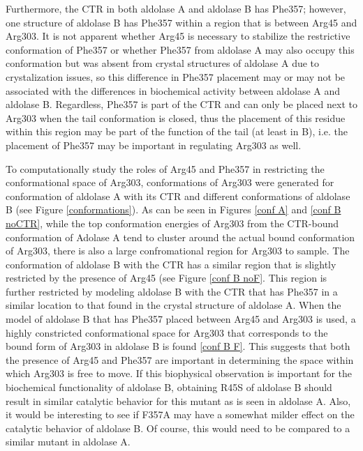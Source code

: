 \documentclass[11pt,a4paper]{article}
\begin{document}
	Furthermore,
	the CTR in both aldolase A and aldolase B has Phe357; however, one structure of aldolase B has Phe357 within a region that is
	between Arg45 and Arg303.  It is not apparent whether Arg45 is necessary to stabilize the restrictive conformation of Phe357 or whether Phe357
	from aldolase A may
	also occupy this conformation but was absent from crystal structures of aldolase A due to crystalization issues, so this difference
	in Phe357 placement may or may not be associated with the differences in biochemical activity between aldolase A and aldolase B.  Regardless,
	Phe357 is part of the CTR and can only be placed next to Arg303 when the tail conformation is closed, thus the placement of this 
	residue within this region may be part of the function of the tail (at least in B), i.e. the placement of Phe357 may be important in regulating
	Arg303 as well.

	To computationally study the roles of Arg45 and Phe357 in restricting the conformational space of Arg303, conformations of Arg303 
	were generated for conformation of aldolase A with its CTR and different conformations of aldolase B (see Figure \ref{conformations}).  
	As can be seen in Figures \ref{conf A} and \ref{conf B noCTR},
	while the top conformation energies of Arg303 from the CTR-bound conformation of Adolase A tend to cluster around the actual bound conformation
	of Arg303, there is also a large confromational region for Arg303 to sample.  The conformation of aldolase B with the CTR has a similar
	region that is slightly restricted by the presence of Arg45 (see Figure \ref{conf B noF}.  This region is further 
	restricted by modeling aldolase B with the CTR that has Phe357 
	in a similar location to that found in the crystal structure of aldolase A.  When the model of aldolase B that has Phe357 placed between 
	Arg45 and Arg303 is used, a highly constricted conformational space
	for Arg303 that corresponds to the bound form of Arg303 in aldolase B is found \ref{conf B F}.
	This suggests that both the presence of Arg45 and Phe357 are important in determining the space within which Arg303 is free to move.
	If this biophysical observation is important for the biochemical functionality of aldolase B, obtaining R45S of aldolase B should result
	in similar catalytic behavior for this mutant as is seen in aldolase A.  Also, it would be interesting to see if F357A may have a somewhat
	milder effect on the catalytic behavior of aldolase B.  Of course, this would need to be compared to a similar mutant in aldolase A.
\end{document}
